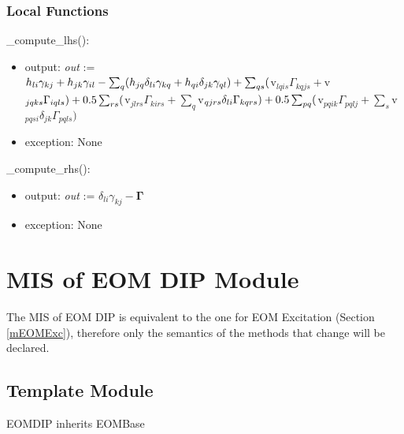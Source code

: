 \documentclass[12pt, titlepage]{article}
\begin{document}
\subsubsection{Local Functions}

\noindent \_compute\_lhs():
\begin{itemize}
	\item output: \textit{out} := \\
	$h_{li}\gamma_{kj} + h_{jk}\gamma_{il} - \sum_{q} 
	(h_{jq}\delta_{li}\gamma_{kq} + h_{qi}\delta_{jk}\gamma_{ql})\\
	+ \sum_{qs}($v$_{lqis}\Gamma_{kqjs} + $v$_{jqks}\Gamma_{iqls})\\
	+ 0.5\sum_{rs}($v$_{jlrs}\Gamma_{kirs} + 
	\sum_{q}$v$_{qjrs}\delta_{li}\Gamma_{kqrs})\\
	+ 0.5 \sum_{pq}($v$_{pqik}\Gamma_{pqlj} + 
	\sum_{s}$v$_{pqsi}\delta_{jk}\Gamma_{pqls})$
	\item exception: None 
\end{itemize}

\noindent\_compute\_rhs():
\begin{itemize}
	\item output: \textit{out} := $\delta_{li}\gamma_{kj} - 
	\boldsymbol{\Gamma}$
	\item exception: None 
\end{itemize}

\newpage

\section{MIS of EOM DIP Module} \label{mEOMDIP}
The MIS of EOM DIP is equivalent to the one for EOM Excitation (Section 
\ref{mEOMExc}), therefore only the semantics of the methods that change will be 
declared.

\subsection{Template Module}

EOMDIP inherits EOMBase
\end{document}
